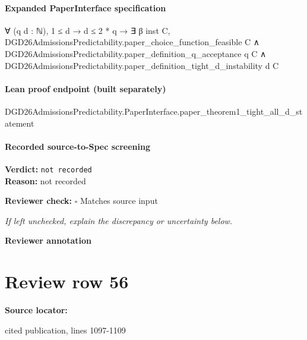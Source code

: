 \documentclass[10pt]{article}
\newcommand{\reviewerbox}{%
  \par\noindent\fbox{\parbox{0.96\linewidth}{\rule{0pt}{0.38in}}}\par
}
\newcommand{\reviewmatch}[1]{%
  \par\noindent\textbf{Reviewer check:} $\square$\; #1\par
  \noindent\emph{If left unchecked, explain the discrepancy or uncertainty below.}\par
}
\begin{document}
\paragraph{Expanded PaperInterface specification}
\begin{ReviewVerbatim}
∀ (q d : ℕ),
  1 ≤ d →
    d ≤ 2 * q →
      ∃ β inst C,
        DGD26AdmissionsPredictability.paper_choice_function_feasible C ∧
          DGD26AdmissionsPredictability.paper_definition_q_acceptance q C ∧
            DGD26AdmissionsPredictability.paper_definition_tight_d_instability d C
\end{ReviewVerbatim}

\paragraph{Lean proof endpoint (built separately)}\begin{ReviewVerbatim}
DGD26AdmissionsPredictability.PaperInterface.paper_theorem1_tight_all_d_statement
\end{ReviewVerbatim}

\paragraph{Recorded source-to-Spec screening}
\textbf{Verdict:} \texttt{not recorded}
\\
\textbf{Reason:} not recorded
\reviewmatch{Matches source input}
\noindent\textbf{Reviewer annotation}\par
\reviewerbox
\clearpage
\hypertarget{source-claim-b3ee09f1e9e6b10d}{}
\section*{Review row 56}
\textbf{Source locator:} {\footnotesize\raggedright cited publication, lines 1097-\allowbreak{}1109\par}
\end{document}
